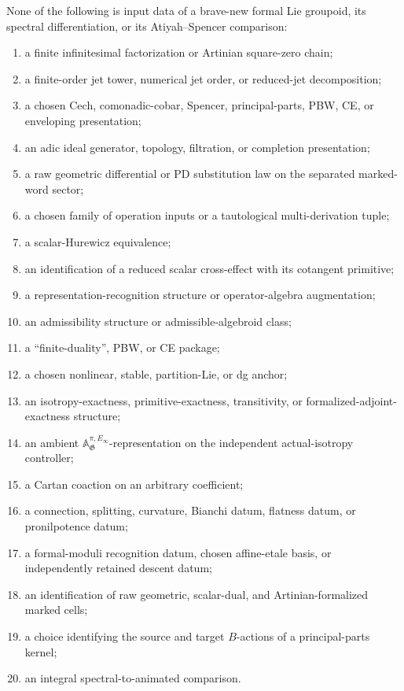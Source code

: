 None of the following is input data of a brave-new formal Lie groupoid, its
spectral differentiation, or its Atiyah--Spencer comparison:
\begin{enumerate}
    \item a finite infinitesimal factorization or Artinian square-zero chain;
    \item a finite-order jet tower, numerical jet order, or reduced-jet
    decomposition;
    \item a chosen Cech, comonadic-cobar, Spencer, principal-parts, PBW, CE,
    or enveloping presentation;
    \item an adic ideal generator, topology, filtration, or completion
    presentation;
    \item a raw geometric differential or PD substitution law on the
    separated marked-word sector;
    \item a chosen family of operation inputs or a tautological
    multi-derivation tuple;
    \item a scalar-Hurewicz equivalence;
    \item an identification of a reduced scalar cross-effect with its
    cotangent primitive;
    \item a representation-recognition structure or operator-algebra
    augmentation;
    \item an admissibility structure or admissible-algebroid class;
    \item a ``finite-duality'', PBW, or CE package;
    \item a chosen nonlinear, stable, partition-Lie, or dg anchor;
    \item an isotropy-exactness, primitive-exactness, transitivity, or
    formalized-adjoint-exactness structure;
    \item an ambient
    $\mathbb A_{\mathfrak G}^{\pi,E_\infty}$-representation on the independent
    actual-isotropy controller;
    \item a Cartan coaction on an arbitrary coefficient;
    \item a connection, splitting, curvature, Bianchi datum, flatness datum,
    or pronilpotence datum;
    \item a formal-moduli recognition datum, chosen affine-etale basis, or
    independently retained descent datum;
    \item an identification of raw geometric, scalar-dual, and
    Artinian-formalized marked cells;
    \item a choice identifying the source and target $B$-actions of a
    principal-parts kernel;
    \item an integral spectral-to-animated comparison.
\end{enumerate}

